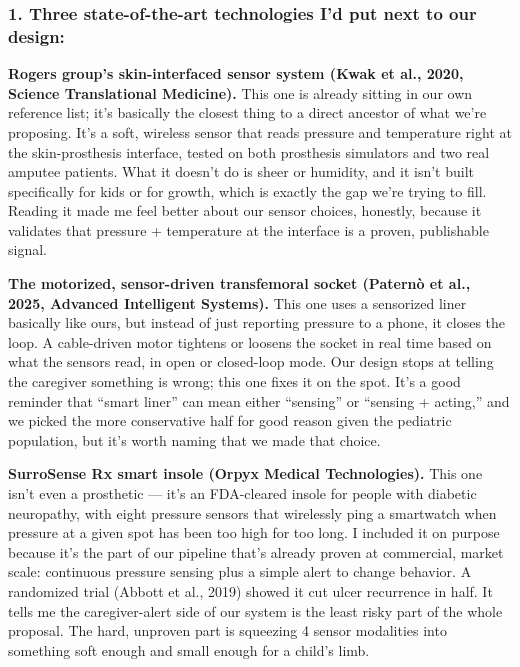 
\clearpage
\hypertarget{q6-amir}{}

\subsubsection*{1. Three state-of-the-art technologies I'd put next to our design:}

\textbf{Rogers group's skin-interfaced sensor system (Kwak et al., 2020, Science Translational Medicine).} This one is already sitting in our own reference list; it's basically the closest thing to a direct ancestor of what we're proposing. It's a soft, wireless sensor that reads pressure and temperature right at the skin-prosthesis interface, tested on both prosthesis simulators and two real amputee patients. What it doesn't do is sheer or humidity, and it isn't built specifically for kids or for growth, which is exactly the gap we're trying to fill. Reading it made me feel better about our sensor choices, honestly, because it validates that pressure + temperature at the interface is a proven, publishable signal.

\textbf{The motorized, sensor-driven transfemoral socket (Paternò et al., 2025, Advanced Intelligent Systems).} This one uses a sensorized liner basically like ours, but instead of just reporting pressure to a phone, it closes the loop. A cable-driven motor tightens or loosens the socket in real time based on what the sensors read, in open or closed-loop mode. Our design stops at telling the caregiver something is wrong; this one fixes it on the spot. It's a good reminder that “smart liner” can mean either “sensing” or “sensing + acting,” and we picked the more conservative half for good reason given the pediatric population, but it's worth naming that we made that choice.

\textbf{SurroSense Rx smart insole (Orpyx Medical Technologies).} This one isn't even a prosthetic — it's an FDA-cleared insole for people with diabetic neuropathy, with eight pressure sensors that wirelessly ping a smartwatch when pressure at a given spot has been too high for too long. I included it on purpose because it's the part of our pipeline that's already proven at commercial, market scale: continuous pressure sensing plus a simple alert to change behavior. A randomized trial (Abbott et al., 2019) showed it cut ulcer recurrence in half. It tells me the caregiver-alert side of our system is the least risky part of the whole proposal. The hard, unproven part is squeezing 4 sensor modalities into something soft enough and small enough for a child's limb.

